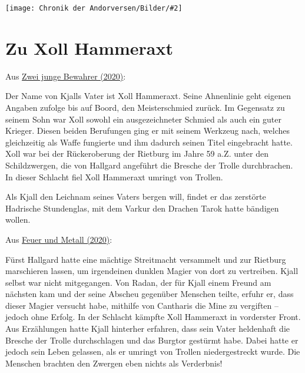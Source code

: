 \documentclass[10pt, a4paper, oneside]{book}
\newcommand{\fillbreak}{\vspace*{\fill}\columnbreak}
\newcommand{\refstorytext}[1]{\hyperref[Storytext: #1]{#1}}
\newcommand{\bildmitts}[2][height=0.32\textwidth,width=0.48\textwidth,keepaspectratio]{%
    \begin{center}
        \texttt{[image: Chronik der Andorversen/Bilder/\#2]}
    \end{center}
}
\begin{document}
\begin{multicols}{2}
\bildmitts{Das Lied des Königs Chada Lonas.jpg}





\fillbreak
\section{Zu Xoll Hammeraxt}

\begin{center}
    Aus \refstorytext{Zwei junge Bewahrer (2020)}:
\end{center}

Der Name von Kjalls Vater ist Xoll Hammeraxt. Seine Ahnenlinie geht eigenen Angaben zufolge bis auf Boord, den Meisterschmied zurück. Im Gegensatz zu seinem Sohn war Xoll sowohl ein ausgezeichneter Schmied als auch ein guter Krieger. Diesen beiden Berufungen ging er mit seinem Werkzeug nach, welches gleichzeitig als Waffe fungierte und ihm dadurch seinen Titel eingebracht hatte. Xoll war bei der Rückeroberung der Rietburg im Jahre 59 a.Z. unter den Schildzwergen, die von Hallgard angeführt die Bresche der Trolle durchbrachen. In dieser Schlacht fiel Xoll Hammeraxt umringt von Trollen.

Als Kjall den Leichnam seines Vaters bergen will, findet er das zerstörte Hadrische Stundenglas, mit dem Varkur den Drachen Tarok hatte bändigen wollen.


\begin{center}
    Aus \refstorytext{Feuer und Metall (2020)}:
\end{center}

Fürst Hallgard hatte eine mächtige Streitmacht versammelt und zur Rietburg marschieren lassen, um irgendeinen dunklen Magier von dort zu vertreiben. Kjall selbst war nicht mitgegangen. Von Radan, der für Kjall einem Freund am nächsten kam und der seine Abscheu gegenüber Menschen teilte, erfuhr er, dass dieser Magier versucht habe, mithilfe von Cantharis die Mine zu vergiften – jedoch ohne Erfolg. In der Schlacht kämpfte Xoll Hammeraxt in vorderster Front. Aus Erzählungen hatte Kjall hinterher erfahren, dass sein Vater heldenhaft die Bresche der Trolle durchschlagen und das Burgtor gestürmt habe. Dabei hatte er jedoch sein Leben gelassen, als er umringt von Trollen niedergestreckt wurde. Die Menschen brachten den Zwergen eben nichts als Verderbnis!\bigskip


\end{multicols}
\end{document}
